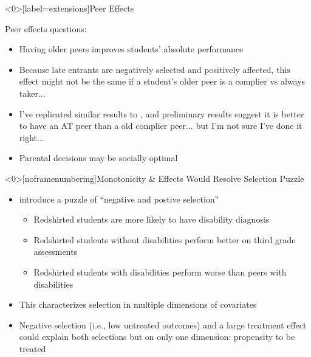 \documentclass[t,aspectratio=169,11pt,presentation]{beamer}
\begin{document}
\begin{frame}<0>[label=extensions]{Peer Effects}

Peer effects questions:
    \begin{itemize}
        \item Having older peers improves students' absolute performance \citep{pena2017creating}
        \item Because late entrants are negatively selected and positively affected, this effect might not be the same if a student's older peer is a complier vs always taker...
        \item I've replicated similar results to \citep{pena2017creating}, and preliminary results suggest it is better to have an AT peer than a old complier peer... but I'm not sure I've done it right...
        \item Parental decisions may be socially optimal
    \end{itemize}

\end{frame}




\begin{frame}<0>[noframenumbering]{Monotonicity \& Effects Would Resolve Selection Puzzle}

\begin{itemize}
    \item \citet{fortner2017kindergarten} introduce a puzzle of ``negative and postive selection''
    \begin{itemize}
        \item Redshirted students are more likely to have disability diagnosis %
        \item Redshirted students without disabilities perform better on third grade assessments
        \item Redshirted students with disabilities perform worse than peers with disabilities
    \end{itemize}
    \vspace{12pt}
    \item  This characterizes selection in multiple dimensions of covariates
    \vspace{12pt}
    \item Negative selection (i.e., low untreated outcomes) and a large treatment effect could explain both selections but on only one dimension: propensity to be treated
    \vspace{12pt}
    \footnotesize
\end{itemize}

\end{frame}
\end{document}
